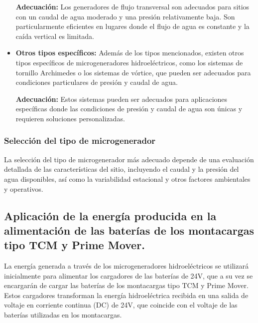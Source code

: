 \documentclass[11pt]{article}
\begin{document}
\begin{itemize}
                \textbf{Adecuación:} Los generadores de flujo transversal son adecuados para sitios con un caudal
                de agua moderado y una presión relativamente baja. Son particularmente eficientes en
                lugares donde el flujo de agua es constante y la caída vertical es limitada.
                
                \item \textbf{Otros tipos específicos:}
                Además de los tipos mencionados, existen otros tipos específicos de
                microgeneradores hidroeléctricos, como los sistemas de tornillo Archimedes o los sistemas
                de vórtice, que pueden ser adecuados para condiciones particulares de presión y caudal de
                agua.

                \textbf{Adecuación:} Estos sistemas pueden ser adecuados para aplicaciones específicas donde las
                condiciones de presión y caudal de agua son únicas y requieren soluciones personalizadas.
            \end{itemize}

            
            \subsubsection{Selección del tipo de microgenerador}

            La selección del tipo de microgenerador más adecuado depende de una evaluación
            detallada de las características del sitio, incluyendo el caudal y la presión del agua
            disponibles, así como la variabilidad estacional y otros factores ambientales y operativos.
            

            \subsection{ Aplicación de la energía producida en la alimentación de las baterías de los
            montacargas tipo TCM y Prime Mover.}

            La energía generada a través de los microgeneradores hidroeléctricos se utilizará
            inicialmente para alimentar los cargadores de las baterías de 24V, que a su vez se
            encargarán de cargar las baterías de los montacargas tipo TCM y Prime Mover. Estos
            cargadores transforman la energía hidroeléctrica recibida en una salida de voltaje en
            corriente continua (DC) de 24V, que coincide con el voltaje de las baterías utilizadas en los
            montacargas.
\end{document}
